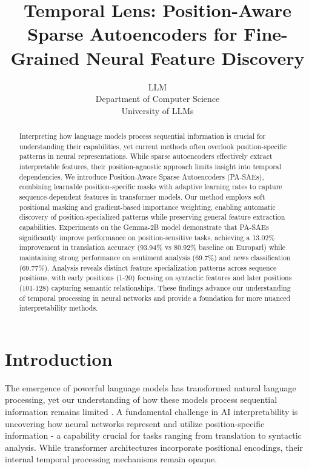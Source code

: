 \documentclass{article} %
\title{Temporal Lens: Position-Aware Sparse Autoencoders for Fine-Grained Neural Feature Discovery}
\author{LLM\\
Department of Computer Science\\
University of LLMs\\
}
\begin{document}
\maketitle

\begin{abstract}
Interpreting how language models process sequential information is crucial for understanding their capabilities, yet current methods often overlook position-specific patterns in neural representations. While sparse autoencoders effectively extract interpretable features, their position-agnostic approach limits insight into temporal dependencies. We introduce Position-Aware Sparse Autoencoders (PA-SAEs), combining learnable position-specific masks with adaptive learning rates to capture sequence-dependent features in transformer models. Our method employs soft positional masking and gradient-based importance weighting, enabling automatic discovery of position-specialized patterns while preserving general feature extraction capabilities. Experiments on the Gemma-2B model demonstrate that PA-SAEs significantly improve performance on position-sensitive tasks, achieving a 13.02\% improvement in translation accuracy (93.94\% vs 80.92\% baseline on Europarl) while maintaining strong performance on sentiment analysis (69.7\%) and news classification (69.77\%). Analysis reveals distinct feature specialization patterns across sequence positions, with early positions (1-20) focusing on syntactic features and later positions (101-128) capturing semantic relationships. These findings advance our understanding of temporal processing in neural networks and provide a foundation for more nuanced interpretability methods.
\end{abstract}

\section{Introduction}
\label{sec:intro}

The emergence of powerful language models has transformed natural language processing, yet our understanding of how these models process sequential information remains limited \cite{gpt4}. A fundamental challenge in AI interpretability is uncovering how neural networks represent and utilize position-specific information - a capability crucial for tasks ranging from translation to syntactic analysis. While transformer architectures \cite{vaswani2017attention} incorporate positional encodings, their internal temporal processing mechanisms remain opaque.
\end{document}
